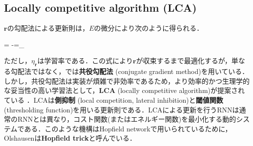 \subsection{ Locally competitive algorithm (LCA) }
$\mathbf{r}$の勾配法による更新則は，$E$の微分により次のように得られる．


= -=\eta_ \cdot{}


ただし，$\eta_{\mathbf{r}}$は学習率である．この式により$\mathbf{r}$が収束するまで最適化するが，単なる勾配法ではなく，\cite{Olshausen1996-xe}では\textbf{共役勾配法} (conjugate gradient method)を用いている．しかし，共役勾配法は実装が煩雑で非効率であるため，より効率的かつ生理学的な妥当性の高い学習法として，\textbf{LCA}  (locally competitive algorithm)が提案されている \cite{Rozell2008-wp}．LCAは\textbf{側抑制} (local competition, lateral inhibition)と\textbf{閾値関数} (thresholding function)を用いる更新則である．LCAによる更新を行うRNNは通常のRNNとは異なり，コスト関数(またはエネルギー関数)を最小化する動的システムである．このような機構はHopfield networkで用いられているために，Olshausenは\textbf{Hopfield trick}と呼んでいる．
